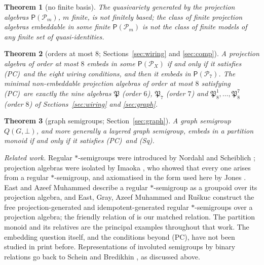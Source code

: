 \documentclass[11pt]{amsart}
\newtheorem{theorem}{Theorem}[section]
\theoremstyle{definition}
\renewcommand{\P}{\mathcal{P}}      %
\newcommand{\PA}{\mathsf{P}}         %
\newcommand{\Qone}{\textup{(PC)}}     %
\newcommand{\Wire}{\textup{(Sq)}}      %
\begin{document}
\begin{theorem}[no finite basis]\label{thm:main-nfb}
The quasivariety generated by the projection algebras $\PA(\P_m)$, $m$ finite, is not finitely based; the class of finite projection algebras embeddable in some finite $\PA(\P_m)$ is not the class of finite models of any finite set of quasi-identities.
\end{theorem}

\begin{theorem}[orders at most $8$; Sections~\ref{sec:wiring} and \ref{sec:comp}]\label{thm:main-census}
A projection algebra of order at most $8$ embeds in some $\PA(\P_X)$ if and only if it satisfies \Qone\ and the eight wiring conditions, and then it embeds in $\PA(\P_7)$. The minimal non-embeddable projection algebras of order at most $8$ satisfying \Qone\ are exactly the nine algebras $\mathfrak P$ (order $6$), $\mathfrak P_7$ (order $7$) and $\mathfrak P_8^1,\dots,\mathfrak P_8^7$ (order $8$) of Sections~\ref{sec:wiring} and \ref{sec:graph}.
\end{theorem}

\begin{theorem}[graph semigroups; Section~\ref{sec:graph}]\label{thm:main-graph}
A graph semigroup $Q(G,\bot)$, and more generally a layered graph semigroup, embeds in a partition monoid if and only if it satisfies \Qone\ and \Wire.
\end{theorem}

\medskip
\noindent\emph{Related work.} Regular $*$-semigroups were introduced by Nordahl and Scheiblich \cite{NS}; projection algebras were isolated by Imaoka \cite{Imaoka80,Imaoka81}, who showed that every one arises from a regular $*$-semigroup, and axiomatised in the form used here by Jones \cite{Jones}. East and Azeef Muhammed \cite{EM} describe a regular $*$-semigroup as a groupoid over its projection algebra, and East, Gray, Azeef Muhammed and Ru\v skuc \cite{EGMR} construct the free projection-generated and idempotent-generated regular $*$-semigroups over a projection algebra; the friendly relation of \cite{EGMR} is our matched relation. The partition monoid and its relatives are the principal examples throughout that work. The embedding question itself, and the conditions beyond \Qone, have not been studied in print before. Representations of involuted semigroups by binary relations go back to Schein \cite{Schein} and Bredikhin \cite{Bredikhin}, as discussed above.
\end{document}
